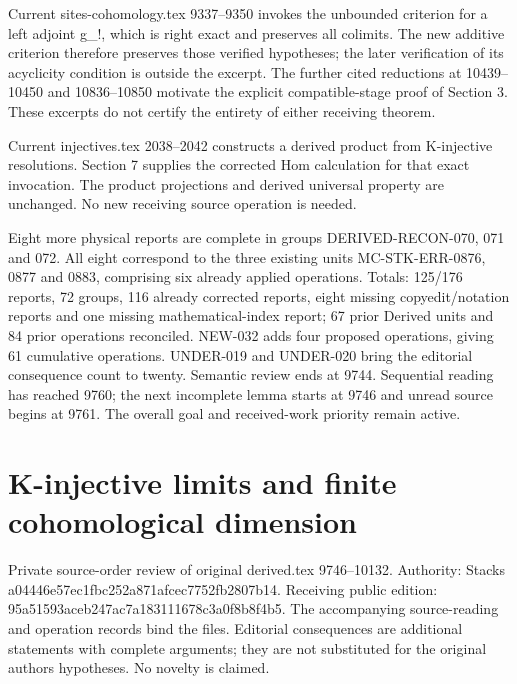 \documentclass[11pt]{article}
\begin{document}
Current sites-cohomology.tex 9337–\allowbreak{}9350 invokes the unbounded criterion for a left adjoint g\_\allowbreak{}!,\allowbreak{} which is right exact and preserves all colimits. The new additive criterion therefore preserves those verified hypotheses; the later verification of its acyclicity condition is outside the excerpt. The further cited reductions at 10439–\allowbreak{}10450 and 10836–\allowbreak{}10850 motivate the explicit compatible-stage proof of Section 3. These excerpts do not certify the entirety of either receiving theorem.

Current injectives.tex 2038–\allowbreak{}2042 constructs a derived product from K-injective resolutions. Section 7 supplies the corrected Hom calculation for that exact invocation. The product projections and derived universal property are unchanged. No new receiving source operation is needed.

Eight more physical reports are complete in groups DERIVED-RECON-070,\allowbreak{} 071 and 072. All eight correspond to the three existing units MC-STK-ERR-0876,\allowbreak{} 0877 and 0883,\allowbreak{} comprising six already applied operations. Totals:\allowbreak{} 125/\allowbreak{}176 reports,\allowbreak{} 72 groups,\allowbreak{} 116 already corrected reports,\allowbreak{} eight missing copyedit/\allowbreak{}notation reports and one missing mathematical-index report; 67 prior Derived units and 84 prior operations reconciled. NEW-032 adds four proposed operations,\allowbreak{} giving 61 cumulative operations. UNDER-019 and UNDER-020 bring the editorial consequence count to twenty. Semantic review ends at 9744. Sequential reading has reached 9760; the next incomplete lemma starts at 9746 and unread source begins at 9761. The overall goal and received-work priority remain active.
\clearpage
\section{K-injective limits and finite cohomological dimension}\label{proofs-9746-10132-k-injective-limits-and-finite-cohomological-dimension}

Private source-order review of original derived.tex 9746–\allowbreak{}10132. Authority:\allowbreak{} Stacks a04446e5\allowbreak{}7ec1fbc2\allowbreak{}52a871af\allowbreak{}cec7752f\allowbreak{}b2807b14. Receiving public edition:\allowbreak{} 95a51593\allowbreak{}aceb247a\allowbreak{}c7a18311\allowbreak{}1678c3a0\allowbreak{}f8b8f4b5. The accompanying source-reading and operation records bind the files. Editorial consequences are additional statements with complete arguments; they are not substituted for the original author\textquotesingle s hypotheses. No novelty is claimed.
\end{document}
